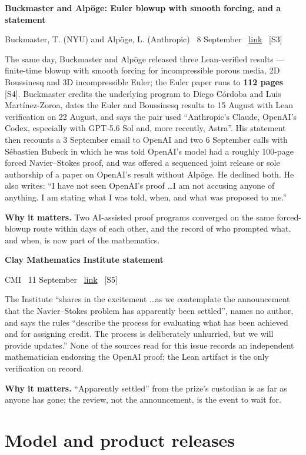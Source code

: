\documentclass[11pt,a4paper]{article}
\newcommand{\entry}[4]{%
  \par\vspace{0.7em}%
  \Needspace*{5\baselineskip}%
  {\sffamily\bfseries\color{brandink}#1}\par
  {\footnotesize\color{brandgrey}#2 \textbullet\ \href{#3}{link} \textbullet\ \srcref{#4}}\par
  \vspace{0.15em}}
\newcommand{\why}[1]{\par{\small\textbf{Why it matters.} #1}\par}
\newcommand{\srcref}[1]{\textcolor{brandaccent}{[S#1]}}
\begin{document}
\entry{Buckmaster and Alp\"oge: Euler blowup with smooth forcing, and a statement}{Buckmaster, T. (NYU) and Alp\"oge, L. (Anthropic) \textbullet\ 8 September}{https://cims.nyu.edu/~tristanb/statement.pdf}{3}
The same day, Buckmaster and Alp\"oge released three Lean-verified results --- finite-time
blowup with smooth forcing for incompressible porous media, 2D Boussinesq and 3D
incompressible Euler; the Euler paper runs to \textbf{112 pages} \srcref{4}. Buckmaster
credits the underlying program to Diego C\'ordoba and Luis Mart\'inez-Zoroa, dates the Euler
and Boussinesq results to 15 August with Lean verification on 22 August, and says the pair
used ``Anthropic's Claude, OpenAI's Codex, especially with GPT-5.6 Sol and, more recently,
Astra''. His statement then recounts a 3 September email to OpenAI and two 6 September calls
with S\'ebastien Bubeck in which he was told OpenAI's model had a roughly 100-page forced
Navier--Stokes proof, and was offered a sequenced joint release or sole authorship of a
paper on OpenAI's result without Alp\"oge. He declined both. He also writes: ``I have not seen
OpenAI's proof \ldots I am not accusing anyone of anything. I am stating what I was told,
when, and what was proposed to me.''
\why{Two AI-assisted proof programs converged on the same forced-blowup route within
days of each other, and the record of who prompted what, and when, is now part of the
mathematics.}

\entry{Clay Mathematics Institute statement}{CMI \textbullet\ 11 September}{https://www.claymath.org/news/navier-stokes-announcement/}{5}
The Institute ``shares in the excitement \ldots as we contemplate the announcement that the
Navier--Stokes problem has apparently been settled'', names no author, and says the rules
``describe the process for evaluating what has been achieved and for assigning credit. The
process is deliberately unhurried, but we will provide updates.'' None of the sources read for
this issue records an independent mathematician endorsing the OpenAI proof; the Lean
artifact is the only verification on record.
\why{``Apparently settled'' from the prize's custodian is as far as anyone has gone; the
review, not the announcement, is the event to wait for.}

\section{Model and product releases}
\end{document}
